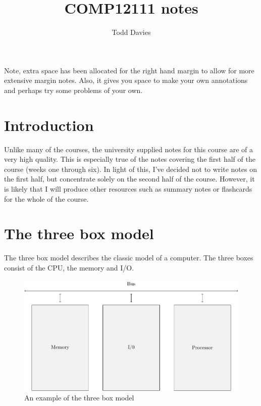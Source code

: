 \documentclass{article}
\begin{document}
\author{Todd Davies}
\title{COMP12111 notes}
\chead{}

\maketitle
\thispagestyle{empty}

{\small Note, extra space has been allocated for the right hand margin to allow
for more extensive margin notes. Also, it gives you space to make your own
annotations and perhaps try some problems of your own.}

\tableofcontents
\thispagestyle{empty}

\newpage
\setcounter{page}{1}

\section*{Introduction}

Unlike many of the courses, the university supplied notes for this course are of
a very high quality. This is especially true of the notes covering the first
half of the course (weeks one through six). In light of this, I've decided not
to write notes on the first half, but concentrate solely on the second half of
the course. However, it is likely that I will produce other resources such as
summary notes or flashcards for the whole of the course.

\section{The three box model}

The three box model describes the classic model of a computer. The three boxes
consist of the CPU, the memory and I/O.

\begin{figure}[ht!]
	\centering
	\includegraphics[width=\textwidth]{three_box_model.pdf}
	\caption{An example of the three box model}
	\label{overflow}
\end{figure}
\end{document}
